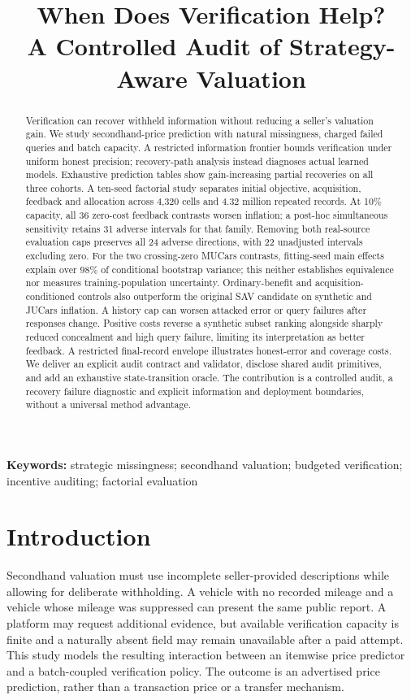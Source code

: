 \documentclass[11pt]{article}
\title{When Does Verification Help?\\A Controlled Audit of Strategy-Aware Valuation}
\author{}
\date{}
\begin{document}
\maketitle
\begin{abstract}
Verification can recover withheld information without reducing a seller's
valuation gain. We study secondhand-price prediction with natural missingness,
charged failed queries and batch capacity. A restricted information frontier
bounds verification under uniform honest precision; recovery-path analysis
instead diagnoses actual learned models. Exhaustive prediction tables show
gain-increasing partial recoveries on all three cohorts.
A ten-seed factorial study separates initial objective, acquisition, feedback
and allocation across 4,320 cells and 4.32 million repeated records. At 10\%
capacity, all 36 zero-cost feedback contrasts worsen inflation; a post-hoc
simultaneous sensitivity retains 31 adverse intervals for that family.
Removing both real-source evaluation caps preserves all 24 adverse directions,
with 22 unadjusted intervals excluding zero. For the two crossing-zero MUCars
contrasts, fitting-seed main effects explain over 98\% of conditional bootstrap
variance; this neither establishes equivalence nor measures training-population
uncertainty. Ordinary-benefit and acquisition-conditioned controls also outperform
the original SAV candidate on synthetic and JUCars inflation. A history cap
can worsen attacked error or query failures after responses change. Positive
costs reverse a synthetic subset ranking alongside sharply reduced concealment
and high query failure, limiting its interpretation as better feedback.
A restricted final-record envelope illustrates honest-error and coverage costs.
We deliver an explicit audit contract and validator, disclose shared audit
primitives, and add an exhaustive state-transition oracle. The contribution is
a controlled audit, a recovery failure diagnostic and explicit information
and deployment boundaries, without a universal method advantage.
\end{abstract}
\noindent\textbf{Keywords:} strategic missingness; secondhand valuation; budgeted verification; incentive auditing; factorial evaluation

\section{Introduction}\label{sec:introduction}
Secondhand valuation must use incomplete seller-provided descriptions while
allowing for deliberate withholding. A vehicle with no recorded mileage and a
vehicle whose mileage was suppressed can present the same public report. A
platform may request additional evidence, but available verification capacity
is finite and a naturally absent field may remain unavailable after a paid
attempt. This study models the resulting interaction between an itemwise price
predictor and a batch-coupled verification policy. The outcome is an advertised
price prediction, rather than a transaction price or a transfer mechanism.
\end{document}
